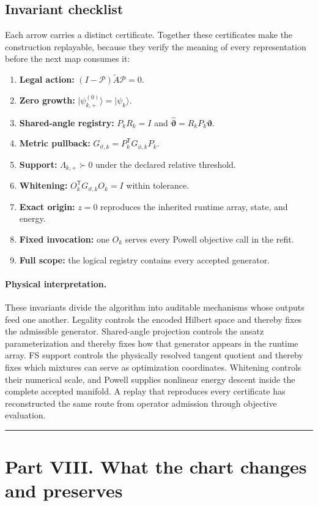 \documentclass[10pt,twocolumn]{article}
\newcommand{\ket}[1]{\lvert #1\rangle}
\newcommand{\conceptbreak}{%
  \par\medskip\noindent
  {\color{black!30}\rule{\columnwidth}{0.35pt}}%
  \par\medskip}
\newcommand{\physical}{\paragraph{Physical interpretation.}}
\begin{document}
\subsection*{Invariant checklist}

Each arrow carries a distinct certificate. Together these certificates make
the construction replayable, because they verify the meaning of every
representation before the next map consumes it:
\begin{enumerate}[leftmargin=1.25em,itemsep=2pt,topsep=2pt]
\item \textbf{Legal action:}
\((I-\mathcal P)\widetilde A\mathcal P=0\).
\item \textbf{Zero growth:}
\(\ket{\psi_{k,+}^{(0)}}=\ket{\psi_k}\).
\item \textbf{Shared-angle registry:}
\(P_kR_k=I\) and
\(\widehat{\bm\vartheta}=R_kP_k\bm\vartheta\).
\item \textbf{Metric pullback:}
\(G_{\vartheta,k}=P_k^{\mathsf T}G_{\phi,k}P_k\).
\item \textbf{Support:}
\(\Lambda_{k,+}\succ0\) under the declared relative threshold.
\item \textbf{Whitening:}
\(O_k^{\mathsf T}G_{\vartheta,k}O_k=I\) within tolerance.
\item \textbf{Exact origin:}
\(z=0\) reproduces the inherited runtime array, state, and energy.
\item \textbf{Fixed invocation:}
one \(O_k\) serves every Powell objective call in the refit.
\item \textbf{Full scope:}
the logical registry contains every accepted generator.
\end{enumerate}

\physical These invariants divide the algorithm into auditable mechanisms
whose outputs feed one another. Legality controls the encoded Hilbert space and
thereby fixes the admissible generator. Shared-angle projection controls the
ansatz parameterization and thereby fixes how that generator appears in the
runtime array. FS support controls the physically resolved tangent quotient and
thereby fixes which mixtures can serve as optimization coordinates. Whitening
controls their numerical scale, and Powell supplies nonlinear energy descent
inside the complete accepted manifold. A replay that reproduces every
certificate has reconstructed the same route from operator admission through
objective evaluation.

\conceptbreak

\section*{Part VIII. What the chart changes and preserves}
\end{document}
